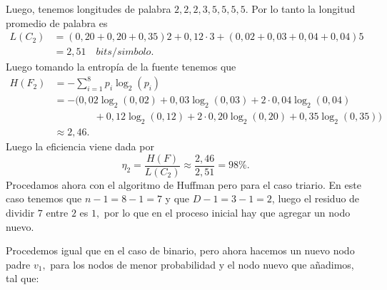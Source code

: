 \begin{sols}
 Luego, tenemos longitudes de palabra $2,2,2,3,5,5,5,5.$ Por lo tanto la longitud promedio de palabra es
\begin{align*}
    L(C_2)&=(0,20+0,20+0,35)2+0,12\cdot3+(0,02+0,03+0,04+0,04)5\\
    &=2,51\quad bits/simbolo.
\end{align*}
Luego tomando la entropía de la fuente tenemos que
\begin{align*}
    H(F_2)&=-\sum_{i=1}^8p_i\log_2(p_i)\\
    &=-(0,02\log_2(0,02)+0,03\log_2(0,03)+2\cdot0,04\log_2(0,04)\\
    &\phantom{++++}+0,12\log_2(0,12)+2\cdot0,20\log_2(0,20)+0,35\log_2(0,35))\\
    &\approx 2,46.
\end{align*}
Luego la eficiencia viene dada por
$$\eta_2=\dfrac{H(F)}{L(C_2)}\approx\frac{2,46}{2,51}=98\%.$$
Procedamos ahora con el algoritmo de Huffman pero para el caso triario. En este caso tenemos que $n-1=8-1=7$ y que $D-1=3-1=2$, luego el residuo de dividir $7$ entre $2$ es $1,$ por lo que en el proceso inicial hay que agregar un nodo nuevo.
\begin{center}
    \end{center}
Procedemos igual que en el caso de binario, pero ahora hacemos un nuevo nodo padre $v_1,$ para los nodos de menor probabilidad y el nodo nuevo que añadimos, tal que:
\begin{center}
       \begin{tikzpicture}


\end{tikzpicture}
\end{center}
\end{sols}
